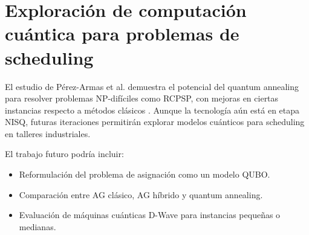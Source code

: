 \section{Exploración de computación cuántica para problemas de scheduling}

El estudio de Pérez-Armas et al. demuestra el potencial del quantum annealing para resolver 
problemas NP-difíciles como RCPSP, con mejoras en ciertas instancias respecto a métodos 
clásicos \cite{file_quantum}. Aunque la tecnología aún está en etapa NISQ, futuras iteraciones permitirán 
explorar modelos cuánticos para scheduling en talleres industriales.

El trabajo futuro podría incluir:
\begin{itemize}
    \item Reformulación del problema de asignación como un modelo QUBO.
    \item Comparación entre AG clásico, AG híbrido y quantum annealing.
    \item Evaluación de máquinas cuánticas D-Wave para instancias pequeñas o medianas.
\end{itemize}

